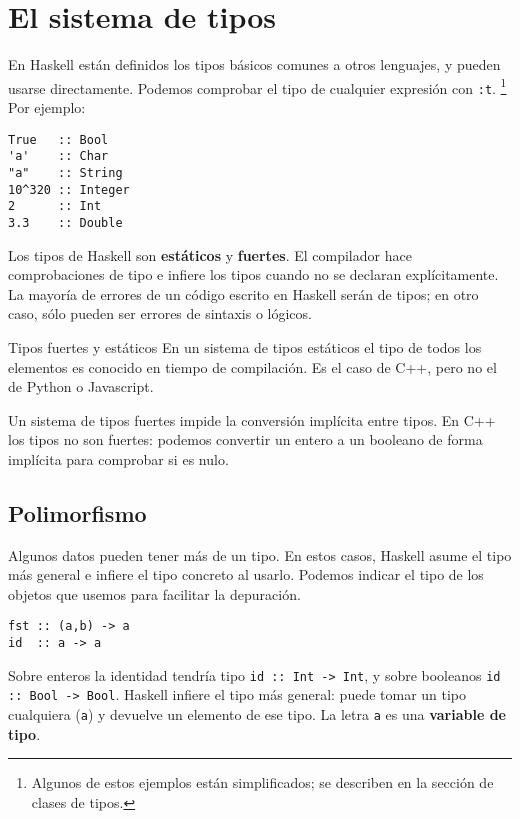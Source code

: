 \section {El sistema de tipos}

En Haskell están definidos los tipos básicos comunes a otros lenguajes,
y pueden usarse directamente.
Podemos comprobar el tipo de cualquier expresión con \texttt{:t}. \footnote{
Algunos de estos ejemplos están simplificados; se describen en la sección de
clases de tipos.} Por ejemplo:

\begin{lstlisting}
True   :: Bool
'a'    :: Char
"a"    :: String
10^320 :: Integer
2      :: Int
3.3    :: Double
\end{lstlisting}

Los tipos de Haskell son \textbf{estáticos} y \textbf{fuertes}.
El compilador hace comprobaciones de tipo e infiere los tipos cuando no se
declaran explícitamente. La mayoría de errores de un código escrito en Haskell
serán de tipos; en otro caso, sólo pueden ser errores de sintaxis o lógicos.

\begin{otro}{Tipos fuertes y estáticos}
  En un sistema de tipos estáticos el tipo de todos los elementos es conocido en tiempo de compilación.
  Es el caso de C++, pero no el de Python o Javascript.

\espacio

Un sistema de tipos fuertes impide la conversión implícita entre tipos. En C++
los tipos no son fuertes: podemos convertir un entero a un booleano
de forma implícita para comprobar si es nulo.
\end{otro}


\subsection{Polimorfismo}

Algunos datos pueden tener más de un tipo. En estos casos, Haskell asume
el tipo más general e infiere el tipo concreto al usarlo.
Podemos indicar el tipo de los objetos que usemos para
facilitar la depuración.

\begin{lstlisting}
fst :: (a,b) -> a
id  :: a -> a
\end{lstlisting}

Sobre enteros la identidad tendría tipo \texttt{id :: Int -> Int}, y sobre
booleanos \texttt{id :: Bool -> Bool}. Haskell infiere el tipo más general: puede
tomar un tipo cualquiera (\texttt{a}) y devuelve un elemento de ese tipo. La letra
\texttt{a} es una \textbf{variable de tipo}.

